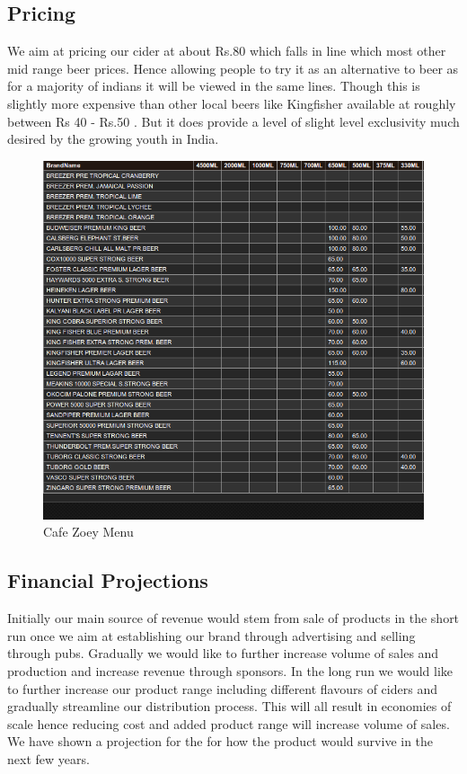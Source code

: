 \documentclass[11pt]{article}
\begin{document}
	\subsection{Pricing}
	We aim at pricing our cider at about Rs.80 which falls in line which most other mid range beer prices. Hence allowing people to try it as an alternative to beer as for a majority of indians it will be viewed in the same lines. Though this is slightly more expensive than other local beers like Kingfisher available at roughly between Rs 40 - Rs.50 . But it does provide a level of slight level exclusivity much desired by the growing youth in India.

	\begin{figure}[h!]
	\caption{Cafe Zoey Menu}
	\centering
	\includegraphics[width=\textwidth]{beerprices.png}
	\end{figure}
  \subsection{Financial Projections}
Initially our main source of revenue would stem from sale of products in the short run once we aim at establishing our brand through advertising and selling through pubs. Gradually we would like to further increase volume of sales and production and increase revenue through sponsors. In the long run we would like to further increase our product range including different flavours of ciders and gradually streamline our distribution process. This will all result in economies of scale hence reducing cost and added product range will increase volume of sales. We have shown a projection for the for how the product would survive in the next few years.
\end{document}
